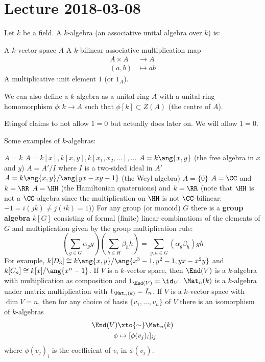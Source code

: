 \section{Lecture 2018-03-08}

\begin{defn}
	Let $k$ be a field.
	A $k$-algebra (an associative unital algebra over $k$) is:
	\begin{itm}
		\io A $k$-vector space $A$
		\io A $k$-bilinear associative multiplication map
			\begin{align*}
				A \times A &\to A \\
				(a,b) &\mapsto ab
			\end{align*}
		\io A multiplicative unit element $1$ (or $1_A$).
	\end{itm}
\end{defn}

\begin{rmk}
	We can also define a $k$-algebra as a unital ring $A$ with a unital ring homomorphism $\phi: k \to A$ such that $\phi[k] \subset Z(A)$ (the centre of $A$).
\end{rmk}

\begin{rmk}
	Etingof claims to not allow $1=0$ but actually does later on.
	We will allow $1=0$.
\end{rmk}

\begin{exam}
	Some examples of $k$-algebras:
	\begin{enum}
		\io $A=k$
		\io $A=k[x],k[x,y],k[x_1,x_2,\ldots],\ldots$
		\io $A=k\ang{x,y}$ (the free algebra in $x$ and $y$)
		\io $A=A'/I$ where $I$ is a two-sided ideal in $A'$
		\io $A=k\ang{x,y}/\ang{yx-xy-1}$ (the Weyl algebra)
		\io $A=\{0\}$
		\io $A=\CC$ and $k=\RR$
		\io $A=\HH$ (the Hamiltonian quaternions) and $k=\RR$ (note that $\HH$ is not a $\CC$-algebra since the multiplication on $\HH$ is not $\CC$-bilinear: $-1=i(jk)\neq j(ik)=1$))
		\io For any group (or monoid) $G$ there is a \textbf{group algebra} $k[G]$ consisting of formal (finite) linear combinations of the elements of $G$ and multiplication given by the group multiplication rule:
		\[\left(\sum_{g\in G}\alpha_gg\right)\left(\sum_{h\in H}\beta_hh\right)=\sum_{g,h\in G}(\alpha_g\beta_h)gh\]
		For example, $k[D_3]\cong k\ang{x,y}/\ang{x^3-1,y^2-1,yx-x^2y}$ and $k[C_n]\cong k[x]/\ang{x^n-1}$.
		\io If $V$ is a $k$-vector space, then $\End(V)$ is a $k$-algebra with multiplication as composition and $1_{\End(V)}=\id_V$.
		\io $\Mat_n(k)$ is a $k$-algebra under matrix multiplication with $1_{\Mat_n(k)}=I_n$.
		If $V$ is a $k$-vector space with $\dim V=n$, then for any choice of basis $\{v_1,\ldots,v_n\}$ of $V$ there is an isomorphism of $k$-algebras
		\begin{align*}
			\End(V) &\xto{\sim} \Mat_n(k) \\
			\phi &\mapsto [\phi(v_j)_i]_{ij}
		\end{align*}
		where $\phi(v_j)_i$ is the coefficient of $v_i$ in $\phi(v_j)$.
	\end{enum}
\end{exam}

